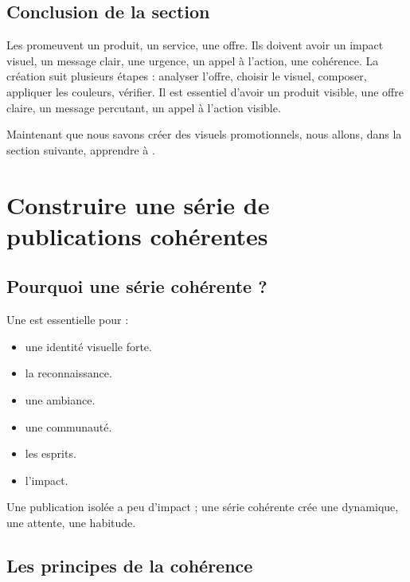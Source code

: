 \subsection*{Conclusion de la section}

Les  promeuvent un produit, un service, une offre. Ils doivent avoir un impact visuel, un message clair, une urgence, un appel à l'action, une cohérence. La création suit plusieurs étapes : analyser l'offre, choisir le visuel, composer, appliquer les couleurs, vérifier. Il est essentiel d'avoir un produit visible, une offre claire, un message percutant, un appel à l'action visible.

Maintenant que nous savons créer des visuels promotionnels, nous allons, dans la section suivante, apprendre à .

\section{Construire une série de publications cohérentes}

\subsection{Pourquoi une série cohérente ?}

Une  est essentielle pour :

\begin{itemize}
    \item {} une identité visuelle forte.
    \item {} la reconnaissance.
    \item {} une ambiance.
    \item {} une communauté.
    \item {} les esprits.
    \item {} l'impact.
\end{itemize}

Une publication isolée a peu d'impact ; une série cohérente crée une dynamique, une attente, une habitude.

\subsection{Les principes de la cohérence}

